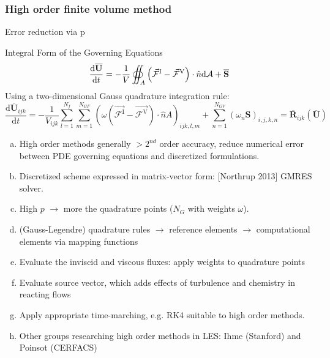 \documentclass{beamer}
\begin{document}
\begin{frame}%
\frametitle{High order finite volume method}
\begin{minipage}[t][1\textheight]{1\textwidth}
\vspace{-20pt}
\begin{exampleblock}{Error reduction via p}
\tiny
\begin{block}{Integral Form of the Governing Equations}
     \[
      \frac{\mathrm{d}\overline{\mathbf{U}}}{\mathrm{d}t} = 
      - \frac{1}{V} \oiint_A \left( \vec{\mathcal{F}}^{\rm I} - 
      \vec{\mathcal{F}}^{\rm V} \right) \cdot \hat{n} \mathrm{d}\mathcal{A} + 
      \overline{\mathbf{S}}
     \] 
    Using a two-dimensional Gauss quadrature integration rule:
    \[  \frac{\mathrm{d}\overline{\mathbf{U}}_{ijk}}{\mathrm{d}t} = -
       \frac{1}{{V}_{ijk}} \sum_{l=1}^{N_f}     
      \sum_{m=1}^{N_{GF}} \left( \omega \left(\vec{\mathcal{F}^{\mathrm{I}}} - 
      \vec{\mathcal{F}^{\mathrm{V}}} \right)\cdot \hat{n} {A} \right)_{ijk,l,m} 
      + \sum_{n=1}^{N_{GV}} \left( \omega_n {\mathbf{S}} \right)_{i,j,k,n}      
       = \overline{\mathbf{R}}_{ijk}  \left( \overline{\mathbf{U}} \right) \]
 
\end{block}

\begin{enumerate}[(a)]
\tiny
\item High order methods  generally $ > 2^{nd}$ order accuracy, reduce numerical error between PDE governing equations and discretized formulations.
\item Discretized scheme expressed in matrix-vector form: [Northrup 2013] GMRES solver.\item High $p$ $\rightarrow$ more the quadrature points ($ N_G $ with weights $ \omega $).
\item (Gauss-Legendre) quadrature rules $\rightarrow$ reference elements $\rightarrow$ computational elements via mapping functions
\item Evaluate the inviscid and viscous fluxes: apply weights to quadrature points
\item Evaluate source vector, which adds effects of turbulence and chemistry in reacting flows
\item Apply appropriate time-marching, e.g. RK4 suitable to high order methods.
\item Other groups researching high order methods in LES: Ihme (Stanford) and Poinsot (CERFACS)
\end{enumerate}
\end{exampleblock}
\end{minipage}


\end{frame}







\setcounter{framenumber}{\value{finalframe}}
\end{document}
